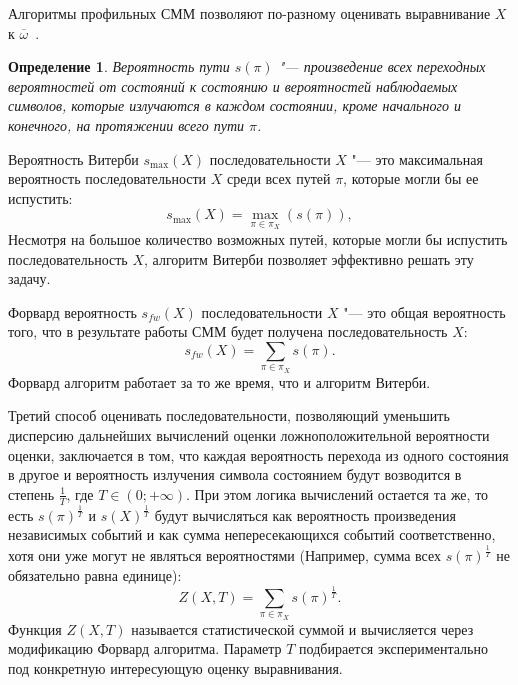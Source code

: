 \documentclass[specialist,
substylefile = spbu_report.rtx,
subf,href,colorlinks=true, 12pt]{disser}
\newtheorem{defenition}{Определение}
\begin{document}
				Алгоритмы профильных СММ позволяют по-разному оценивать выравнивание $X$ к  $\overline{\omega}$~\cite{Newberg2009, Compeau2015a}. 
				
				\begin{defenition}
					Вероятность пути $s(\pi)$ "--- произведение всех переходных вероятностей от состояний к состоянию и вероятностей наблюдаемых символов, которые излучаются в каждом состоянии, кроме начального и конечного, на протяжении всего пути $\pi$. 
				\end{defenition}
				
				Вероятность Витерби $s_{\max}(X)$ последовательности $X$ "--- это максимальная вероятность последовательности $X$ среди всех путей $\pi$, которые могли бы ее испустить:
				\begin{equation*}
					s_{\max}(X) = \underset{\pi \in \pi_{X}}{\max}(s(\pi)),
					\label{eq:3}
				\end{equation*}
				Несмотря на большое количество возможных путей, которые могли бы испустить последовательность $X$, алгоритм Витерби позволяет эффективно решать эту задачу.
				
				Форвард вероятность $s_{fw}(X)$ последовательности $X$ "--- это общая вероятность того, что в результате работы СММ будет получена последовательность $X$:
				\begin{equation*}
					s_{fw}(X) = \sum_{\pi \in \pi_{X}}s(\pi).
					\label{eq:4}
				\end{equation*}		
				Форвард алгоритм работает за то же время, что и алгоритм Витерби.
				
				Третий способ оценивать последовательности, позволяющий уменьшить дисперсию дальнейших вычислений оценки ложноположительной вероятности оценки, заключается в том, что каждая вероятность перехода из одного состояния в другое и вероятность излучения символа состоянием будут возводится в степень $\frac{1}{T}$, где $T \in (0; +\infty)$. При этом логика вычислений остается та же, то есть $s(\pi)^{\frac{1}{T}}$ и $s(X)^{\frac{1}{T}}$ будут вычисляться как вероятность произведения независимых событий и как сумма непересекающихся событий соответственно, хотя они уже могут не являться вероятностями (Например, сумма всех $s(\pi)^\frac{1}{T}$ не обязательно равна единице):
				\begin{equation*}
					Z(X, T)	= \sum_{\pi \in \pi_{X}}s(\pi)^{\frac{1}{T}}.
					\label{eq:5}
				\end{equation*}		
				Функция $Z(X, T)$ называется статистической суммой и вычисляется через модификацию Форвард алгоритма. Параметр $T$ подбирается экспериментально под конкретную интересующую оценку выравнивания.
\end{document}
